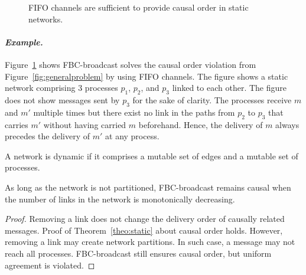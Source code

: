 \begin{figure}
  \begin{center}
    
    \caption{\label{fig:static}FIFO channels are sufficient to provide causal
      order in static networks.}
  \end{center}
\end{figure}

\paragraph{\emph{Example.}}Figure~\ref{fig:static} shows FBC-broadcast solves
the causal order violation from Figure~\ref{fig:generalproblem} by using FIFO
channels.  The figure shows a static network comprising 3 processes $p_1$,
$p_2$, and $p_3$ linked to each other. The figure does not show messages sent by
$p_3$ for the sake of clarity.  The processes receive $m$ and $m'$ multiple
times but there exist no link in the paths from $p_2$ to $p_3$ that carries $m'$
without having carried $m$ beforehand. Hence, the delivery of $m$ always
precedes the delivery of $m'$ at any process.


\begin{definition}
  A network is dynamic if it comprises a mutable set of edges and a mutable set
  of processes.
\end{definition}

\begin{theorem}
  As long as the network is not partitioned, FBC-broadcast remains causal when
  the number of links in the network is monotonically decreasing.

\end{theorem}

\begin{proof}
  Removing a link does not change the delivery order of causally related
  messages. Proof of Theorem~\ref{theo:static} about causal order holds.
  However, removing a link may create network partitions. In such case, a
  message may not reach all processes. FBC-broadcast still ensures causal order,
  but uniform agreement is violated.
\end{proof}

